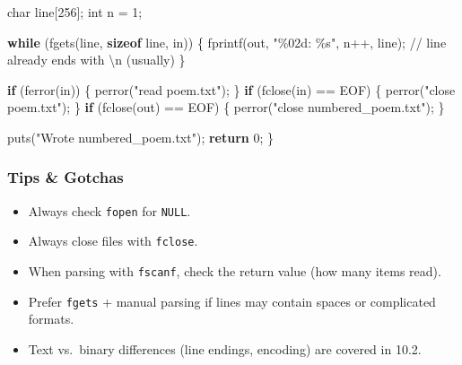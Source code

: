 \documentclass[
  letterpaper,
  DIV=11,
  numbers=noendperiod]{scrreprt}
\newenvironment{Shaded}{\begin{snugshade}}{\end{snugshade}}
\newcommand{\CommentTok}[1]{\textcolor[rgb]{0.37,0.37,0.37}{#1}}
\newcommand{\ControlFlowTok}[1]{\textcolor[rgb]{0.00,0.23,0.31}{\textbf{#1}}}
\newcommand{\DataTypeTok}[1]{\textcolor[rgb]{0.68,0.00,0.00}{#1}}
\newcommand{\DecValTok}[1]{\textcolor[rgb]{0.68,0.00,0.00}{#1}}
\newcommand{\KeywordTok}[1]{\textcolor[rgb]{0.00,0.23,0.31}{\textbf{#1}}}
\newcommand{\NormalTok}[1]{\textcolor[rgb]{0.00,0.23,0.31}{#1}}
\newcommand{\OperatorTok}[1]{\textcolor[rgb]{0.37,0.37,0.37}{#1}}
\newcommand{\SpecialCharTok}[1]{\textcolor[rgb]{0.37,0.37,0.37}{#1}}
\newcommand{\StringTok}[1]{\textcolor[rgb]{0.13,0.47,0.30}{#1}}
\providecommand{\tightlist}{%
  \setlength{\itemsep}{0pt}\setlength{\parskip}{0pt}}
\begin{document}
\begin{Shaded}
\begin{Highlighting}[]
    \DataTypeTok{char}\NormalTok{ line}\OperatorTok{[}\DecValTok{256}\OperatorTok{];}
    \DataTypeTok{int}\NormalTok{ n }\OperatorTok{=} \DecValTok{1}\OperatorTok{;}

    \ControlFlowTok{while} \OperatorTok{(}\NormalTok{fgets}\OperatorTok{(}\NormalTok{line}\OperatorTok{,} \KeywordTok{sizeof}\NormalTok{ line}\OperatorTok{,}\NormalTok{ in}\OperatorTok{))} \OperatorTok{\{}
\NormalTok{        fprintf}\OperatorTok{(}\NormalTok{out}\OperatorTok{,} \StringTok{"}\SpecialCharTok{\%02d}\StringTok{: }\SpecialCharTok{\%s}\StringTok{"}\OperatorTok{,}\NormalTok{ n}\OperatorTok{++,}\NormalTok{ line}\OperatorTok{);} \CommentTok{// line already ends with \textquotesingle{}\textbackslash{}n\textquotesingle{} (usually)}
    \OperatorTok{\}}

    \ControlFlowTok{if} \OperatorTok{(}\NormalTok{ferror}\OperatorTok{(}\NormalTok{in}\OperatorTok{))}  \OperatorTok{\{}\NormalTok{ perror}\OperatorTok{(}\StringTok{"read poem.txt"}\OperatorTok{);} \OperatorTok{\}}
    \ControlFlowTok{if} \OperatorTok{(}\NormalTok{fclose}\OperatorTok{(}\NormalTok{in}\OperatorTok{)} \OperatorTok{==}\NormalTok{ EOF}\OperatorTok{)}  \OperatorTok{\{}\NormalTok{ perror}\OperatorTok{(}\StringTok{"close poem.txt"}\OperatorTok{);} \OperatorTok{\}}
    \ControlFlowTok{if} \OperatorTok{(}\NormalTok{fclose}\OperatorTok{(}\NormalTok{out}\OperatorTok{)} \OperatorTok{==}\NormalTok{ EOF}\OperatorTok{)} \OperatorTok{\{}\NormalTok{ perror}\OperatorTok{(}\StringTok{"close numbered\_poem.txt"}\OperatorTok{);} \OperatorTok{\}}

\NormalTok{    puts}\OperatorTok{(}\StringTok{"Wrote numbered\_poem.txt"}\OperatorTok{);}
    \ControlFlowTok{return} \DecValTok{0}\OperatorTok{;}
\OperatorTok{\}}
\end{Highlighting}
\end{Shaded}

\subsubsection{Tips \& Gotchas}\label{tips-gotchas}

\begin{itemize}
\tightlist
\item
  Always check \texttt{fopen} for \texttt{NULL}.
\item
  Always close files with \texttt{fclose}.
\item
  When parsing with \texttt{fscanf}, check the return value (how many
  items read).
\item
  Prefer \texttt{fgets} + manual parsing if lines may contain spaces or
  complicated formats.
\item
  Text vs.~binary differences (line endings, encoding) are covered in
  10.2.
\end{itemize}
\end{document}
